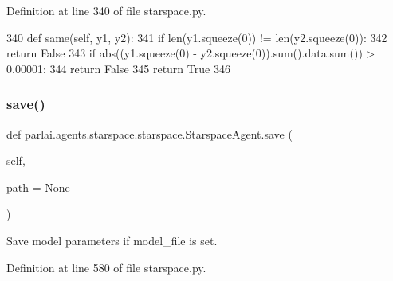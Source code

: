 Definition at line 340 of file starspace.\+py.


\begin{DoxyCode}
340     \textcolor{keyword}{def }same(self, y1, y2):
341         \textcolor{keywordflow}{if} len(y1.squeeze(0)) != len(y2.squeeze(0)):
342             \textcolor{keywordflow}{return} \textcolor{keyword}{False}
343         \textcolor{keywordflow}{if} abs((y1.squeeze(0) - y2.squeeze(0)).sum().data.sum()) > 0.00001:
344             \textcolor{keywordflow}{return} \textcolor{keyword}{False}
345         \textcolor{keywordflow}{return} \textcolor{keyword}{True}
346 
\end{DoxyCode}
\mbox{\label{classparlai_1_1agents_1_1starspace_1_1starspace_1_1StarspaceAgent_a55b3dab4e31cee40441105efb66004ac}} 
\subsubsection{\texorpdfstring{save()}{save()}}
{\footnotesize\ttfamily def parlai.\+agents.\+starspace.\+starspace.\+Starspace\+Agent.\+save (\begin{DoxyParamCaption}\item[{}]{self,  }\item[{}]{path = {\ttfamily None} }\end{DoxyParamCaption})}

\begin{DoxyVerb}Save model parameters if model_file is set.
\end{DoxyVerb}
 

Definition at line 580 of file starspace.\+py.


